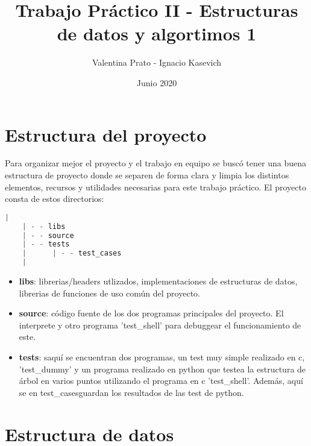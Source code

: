 \documentclass[a4paper, 12pt]{article}
\title{Trabajo Práctico II - Estructuras de datos y algortimos 1}
\author{Valentina Prato - Ignacio Kasevich }
\date{Junio 2020}
\begin{document}
\maketitle
\section{Estructura del proyecto}
	Para organizar mejor el proyecto y el trabajo en equipo se buscó tener una buena estructura de proyecto donde se separen de forma clara y limpia los distintos elementos, recursos y utilidades necesarias para este trabajo práctico. El proyecto consta de estos directorios:
	\begin{lstlisting}[language=C]
    |
    | - - libs
    | - - source               
    | - - tests
    |      | - - test_cases
    |
    \end{lstlisting}
    
\begin{itemize}
\item \textbf{libs}: librerias/headers utlizados, implementaciones de estructuras de datos, librerias de funciones de uso común del proyecto.
\item \textbf{source}: código fuente de los dos programas principales del proyecto. El interprete y otro programa 'test\_shell' para debuggear el funcionamiento de este.
\item  \textbf{tests}: saquí se encuentran dos programas, un test muy simple realizado en c, 'test\_dummy' y un programa realizado en python que testea la estructura de árbol en varios puntos utilizando el programa en c 'test\_shell'. Además, aquí se en test\_casesguardan los resultados de las test de python.
\end{itemize}

\section{Estructura de datos}
\end{document}
